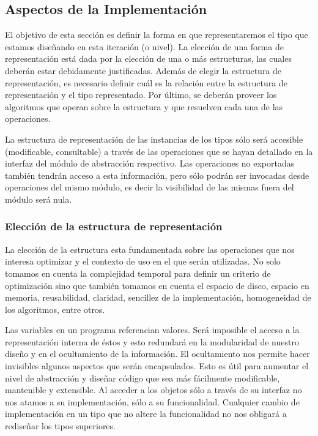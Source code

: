 \subsection{Aspectos de la Implementaci\'on}

El objetivo de esta secci\'on es definir la forma en que representaremos el tipo que estamos dise\~nando en esta iteraci\'on (o nivel). La elecci\'on de una forma de representaci\'on est\'a dada por la elecci\'on de una o m\'as estructuras, las cuales deber\'an estar debidamente justificadas. Adem\'as de elegir la estructura de representaci\'on, es necesario definir cu\'al es la relaci\'on entre la estructura de representaci\'on y el tipo representado. Por \'ultimo, se deber\'an proveer los algoritmos que operan sobre la estructura y que resuelven cada una de las operaciones.

La estructura de representaci\'on de las instancias de los tipos s\'olo ser\'a accesible (modificable, consultable) a trav\'es de las operaciones que se hayan detallado en la interfaz del m\'odulo de abstracci\'on respectivo. Las operaciones no exportadas tambi\'en tendr\'an acceso a esta informaci\'on, pero s\'olo podr\'an ser invocadas desde operaciones del mismo m\'odulo, es decir la visibilidad de las mismas fuera del m\'odulo ser\'a nula.

\subsubsection{Elecci\'on de la estructura de representaci\'on} %

La elecci\'on de la estructura esta fundamentada sobre las operaciones que nos interesa optimizar y el contexto de uso en el que ser\'an utilizadas. No solo tomamos en cuenta la complejidad temporal para definir un criterio de optimizaci\'on sino que tambi\'en tomamos en cuenta el espacio de disco, espacio en memoria, reusabilidad, claridad, sencillez de la implementaci\'on, homogeneidad de los algoritmos, entre otros.

Las variables en un programa referencian valores. Ser\'a imposible el acceso a la representaci\'on interna de \'estos y esto redundar\'a en la modularidad de nuestro dise\~no y en el ocultamiento de la informaci\'on. El ocultamiento nos permite hacer invisibles algunos aspectos que ser\'an encapsulados. Esto es \'util para aumentar el nivel de abstracci\'on y dise\~nar c\'odigo que sea m\'as f\'acilmente modificable, mantenible y extensible. Al acceder a los objetos s\'olo a trav\'es de su interfaz no nos atamos a su implementaci\'on, s\'olo a su funcionalidad. Cualquier cambio de implementaci\'on en un tipo que no altere la funcionalidad no nos obligar\'a a redise\~nar los tipos superiores.

